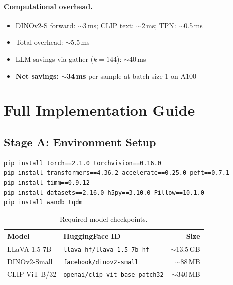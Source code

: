 \documentclass[11pt,a4paper]{article}
\begin{document}
\paragraph{Computational overhead.}
\begin{itemize}[leftmargin=1.5em, itemsep=1pt]
  \item DINOv2-S forward: $\sim$3\,ms; CLIP text: $\sim$2\,ms; TPN: $\sim$0.5\,ms
  \item Total overhead: $\sim$5.5\,ms
  \item LLM savings via gather ($k{=}144$): $\sim$40\,ms
  \item \textbf{Net savings: $\sim$34\,ms} per sample at batch size 1 on A100
\end{itemize}

\section{Full Implementation Guide}
\label{sec:implementation}

\subsection{Stage A: Environment Setup}

\begin{implbox}[title={Required Libraries}]
\begin{lstlisting}[numbers=none, language=bash]
pip install torch==2.1.0 torchvision==0.16.0
pip install transformers==4.36.2 accelerate==0.25.0 peft==0.7.1
pip install timm==0.9.12
pip install datasets==2.16.0 h5py==3.10.0 Pillow==10.1.0
pip install wandb tqdm
\end{lstlisting}
\end{implbox}

\begin{table}[h]
\centering
\caption{Required model checkpoints.}
\renewcommand{\arraystretch}{1.15}
\small
\begin{tabular}{@{}llr@{}}
  \toprule
  Model & HuggingFace ID & Size \\
  \midrule
  LLaVA-1.5-7B & \texttt{llava-hf/llava-1.5-7b-hf} & $\sim$13.5\,GB \\
  DINOv2-Small  & \texttt{facebook/dinov2-small}       & $\sim$88\,MB   \\
  CLIP ViT-B/32 & \texttt{openai/clip-vit-base-patch32} & $\sim$340\,MB \\
  \bottomrule
\end{tabular}
\end{table}
\end{document}
